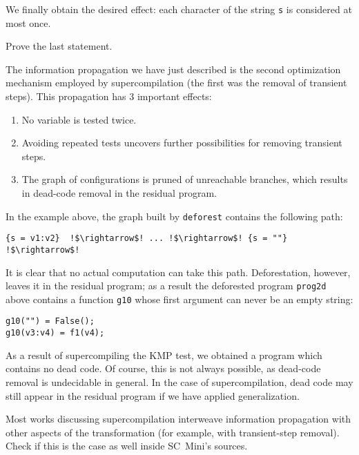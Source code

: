 We finally obtain the desired effect: each character of the string \texttt{s}
is considered at most once.

\begin{exercise}
Prove the last statement.
\end{exercise}

The information propagation we have just described is the second optimization mechanism 
employed by supercompilation (the first was the removal of transient steps).
This propagation has 3 important effects:
\begin{enumerate}
  \item No variable is tested twice.
  \item Avoiding repeated tests uncovers further possibilities for removing transient steps.
  \item The graph of configurations is pruned of unreachable branches, which results in dead-code 
  removal in the residual program.
\end{enumerate}
In the example above, the graph built by \texttt{deforest} contains the following path:
\begin{lstlisting}[language=sll,escapechar=!]
{s = v1:v2}  !$\rightarrow$! ... !$\rightarrow$! {s = ""} !$\rightarrow$!
\end{lstlisting}
It is clear that no actual computation can take this path. 
Deforestation, however, leaves it in the residual program;
as a result the deforested program \texttt{prog2d} above contains a function
\texttt{g10} whose first argument can never be an empty string:
\begin{lstlisting}[language=sll]
g10("") = False();
g10(v3:v4) = f1(v4);
\end{lstlisting}

As a result of supercompiling the KMP test, we obtained a program which contains no dead code.
Of course, this is not always possible, as dead-code removal is undecidable in general.
In the case of supercompilation, dead code may still appear in the residual program
if we have applied generalization.

\begin{exercise}
Most works discussing supercompilation interweave information propagation with other
aspects of the transformation (for example, with transient-step removal).
Check if this is the case as well inside SC~Mini's sources.
\end{exercise}

